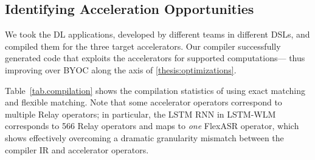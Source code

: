 \subsection{Identifying Acceleration Opportunities}
\label{sec.compilation-stats}

%
We took the \AppNum DL applications, developed by different teams in different DSLs, and compiled them for the three target accelerators.
%
Our compiler successfully generated code that exploits the accelerators for supported computations---%
  thus improving over BYOC along the axis of \cref{thesis:optimizations}.
%


Table~\ref{tab.compilation} shows the compilation statistics of using exact matching and flexible matching.
%
%
%
Note that some accelerator operators correspond to multiple Relay operators; in particular, 
the LSTM RNN in LSTM-WLM corresponds to 566 Relay operators 
and maps to \textit{one} FlexASR operator, which shows \TLA effectively overcoming a dramatic granularity mismatch between the compiler IR and accelerator operators.
%
%
%
%

